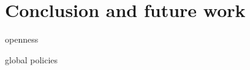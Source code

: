 \documentclass[conference]{IEEEtran}
\begin{document}

\section{Conclusion and future work}\label{sec:conclusion}

openness

global policies




\end{document}
